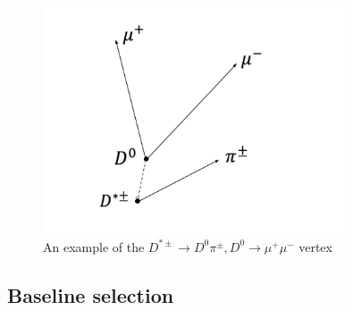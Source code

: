 \begin{figure}[htbp]
    \centering
    \includegraphics[width=0.8\textwidth]{figures/chapter4/vertex_reconstruction.png}
    \caption{An example of the $D^{*\pm} \to D^0 \pi^\pm, D^0 \to \mu^+ \mu^-$ vertex}
    \label{fig:vertex_reconstruction}
\end{figure}

\subsection{Baseline selection}
\label{subsec:baseline_selection}

